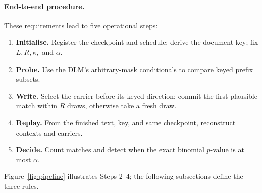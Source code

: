 \begin{samepage}
\paragraph{End-to-end procedure.}
These requirements lead to five operational steps:
\begin{enumerate}[leftmargin=1.6em,itemsep=0pt,topsep=1pt,label=\arabic*.]
\item \textbf{Initialise.} Register the checkpoint and schedule; derive the document key; fix
$L,R,\kappa,$ and $\alpha$.
\item \textbf{Probe.} Use the DLM's arbitrary-mask conditionals to compare keyed prefix subsets.
\item \textbf{Write.} Select the carrier before its keyed direction; commit the first plausible
match within $R$ draws, otherwise take a fresh draw.
\item \textbf{Replay.} From the finished text, key, and same checkpoint, reconstruct contexts and carriers.
\item \textbf{Decide.} Count matches and detect when the exact binomial $p$-value is at most $\alpha$.
\end{enumerate}
Figure~\ref{fig:pipeline} illustrates Steps 2--4; the following subsections define the three rules.
\end{samepage}

